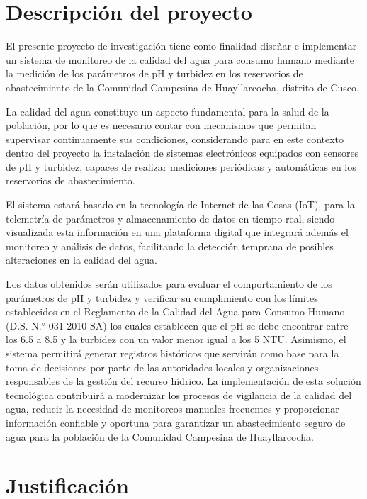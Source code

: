\section{Descripción del proyecto}


El presente proyecto de investigación tiene como finalidad diseñar e implementar un sistema de monitoreo de la calidad del agua para consumo humano mediante la medición de los parámetros de pH y turbidez en los reservorios de abastecimiento de la Comunidad Campesina de Huayllarcocha, distrito de Cusco.

La calidad del agua constituye un aspecto fundamental para la salud de la población, por lo que es necesario contar con mecanismos que permitan supervisar continuamente sus condiciones, considerando para en este contexto dentro del proyecto la instalación de sistemas electrónicos equipados con sensores de pH y turbidez, capaces de realizar mediciones periódicas y automáticas en los reservorios de abastecimiento.

El sistema estará basado en la tecnología de Internet de las Cosas (IoT), para la telemetría de parámetros y almacenamiento de datos en tiempo real, siendo visualizada esta información en una plataforma digital que integrará además el monitoreo y análisis de datos, facilitando la detección temprana de posibles alteraciones en la calidad del agua.

Los datos obtenidos serán utilizados para evaluar el comportamiento de los parámetros de pH y turbidez y verificar su cumplimiento con los límites establecidos en el Reglamento de la Calidad del Agua para Consumo Humano (D.S. N.° 031-2010-SA) los cuales establecen que el pH se debe encontrar entre los 6.5 a 8.5 y la turbidez con un valor menor igual a los 5 NTU. Asimismo, el sistema permitirá generar registros históricos que servirán como base para la toma de decisiones por parte de las autoridades locales y organizaciones responsables de la gestión del recurso hídrico.
La implementación de esta solución tecnológica contribuirá a modernizar los procesos de vigilancia de la calidad del agua, reducir la necesidad de monitoreos manuales frecuentes y proporcionar información confiable y oportuna para garantizar un abastecimiento seguro de agua para la población de la Comunidad Campesina de Huayllarcocha.


\section{Justificación}

